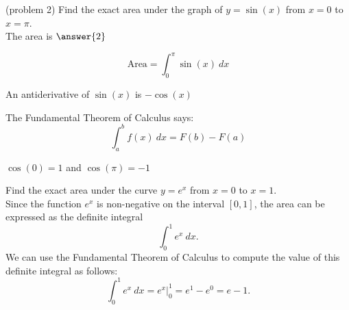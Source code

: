 \documentclass[handout]{ximera}
\begin{document}
\begin{problem}(problem 2)
Find the exact area under the graph of $y = \sin(x)$ from $x = 0$ to $x = \pi$.\\
The area is $\answer{2}$

\begin{hint}
  \[
  \text{Area} = \int_0^{\pi} \sin(x) \ dx 
  \]
\end{hint}
    \begin{hint}
      An antiderivative of $\sin(x)$ is $-\cos(x)$
    \end{hint}
    
    \begin{hint}
      The Fundamental Theorem of Calculus says:
      \[
      \int_a^b f(x) \ dx = F(b) - F(a)
      \]
    \end{hint}    
		\begin{hint}
      $\cos(0) = 1$ and $\cos(\pi) = -1$
    \end{hint}
		
\end{problem}


\begin{example}[example 3]
Find the exact area under the curve $y = e^x$ from $x = 0$ to $x = 1$.\\
Since the function $e^x$ is non-negative on the interval $[0, 1]$, the area can be expressed as the definite integral
\[\int_0^1 e^x \ dx.\]
We can use the Fundamental Theorem of Calculus to compute the value of this definite integral as follows:
\[\int_0^{1} e^x \ dx = e^x \Big|_0^{1} = e^{1} - e^0= e- 1.\]


\begin{image}
\end{image}

\end{example}
\end{document}
